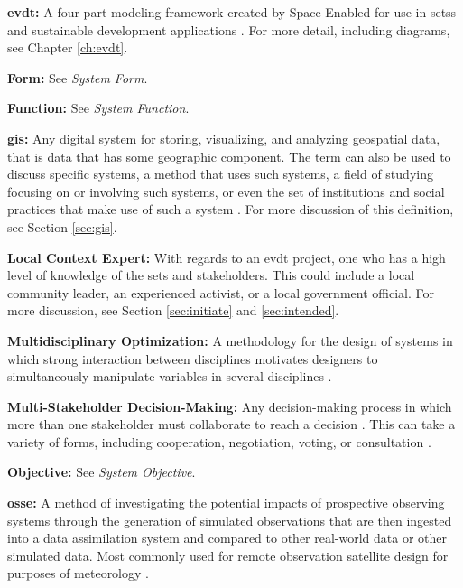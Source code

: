 \textbf{\acf{evdt}:} A four-part modeling framework created by Space Enabled for use in \acp{sets} and sustainable development applications \cite{reidCombiningSocialEnvironmental2019}. For more detail, including diagrams, see Chapter \ref{ch:evdt}.

\textbf{Form:} See \textit{System Form}.

\textbf{Function:} See \textit{System Function}.

\textbf{\acf{gis}:} Any digital system for storing, visualizing, and analyzing geospatial data, that is data that has some geographic component. The term can also be used to discuss specific systems, a method that uses such systems, a field of studying focusing on or involving such systems, or even the set of institutions and social practices that make use of such a system \cite{sheppardGISSocietyResearch1995}. For more discussion of this definition, see Section \ref{sec:gis}.

\textbf{Local Context Expert:} With regards to an \ac{evdt} project, one who has a high level of knowledge of the \ac{sets} and stakeholders. This could include a local community leader, an experienced activist, or a local government official. For more discussion, see Section \ref{sec:initiate} and \ref{sec:intended}.

\textbf{Multidisciplinary Optimization:} A methodology for the design of systems in which strong interaction between disciplines motivates designers to simultaneously manipulate variables in several disciplines \cite{sobieszczanski-sobieskiMultidisciplinaryAerospaceDesign1997}.

\textbf{Multi-Stakeholder Decision-Making:} Any decision-making process in which more than one stakeholder must collaborate to reach a decision \cite{fitzgeraldRecommendationsFramingMultistakeholder2016}. This can take a variety of forms, including cooperation, negotiation, voting, or consultation \cite{garberMultiStakeholderTradeSpace2015}.

\textbf{Objective:} See \textit{System Objective}.

\textbf{\acf{osse}:} A method of investigating the potential impacts of prospective observing systems through the generation of simulated observations that are then ingested into a data assimilation system and compared to other real-world data or other simulated data. Most commonly used for remote observation satellite design for purposes of meteorology \cite{masutaniObservingSystemSimulation2010} .


